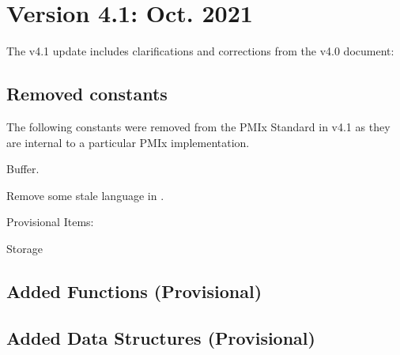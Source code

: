 \section{Version 4.1: Oct. 2021}

The v4.1 update includes clarifications and corrections from the v4.0 document:

\subsection{Removed constants}

The following constants were removed from the \ac{PMIx} Standard in v4.1
as they are internal to a particular \ac{PMIx} implementation.

\begin{constantdesc}
Buffer.
%
\end{constantdesc}

\begin{compactitemize}
    \item Remove some stale language in .
    \item Provisional Items:
    \begin{compactitemize}
        \item Storage 
    \end{compactitemize}
\end{compactitemize}

\subsection{Added Functions (Provisional)}

\begin{compactitemize}
  \item {}
  \item {}
  \item {}
  \item {}
\end{compactitemize}

\subsection{Added Data Structures (Provisional)}

